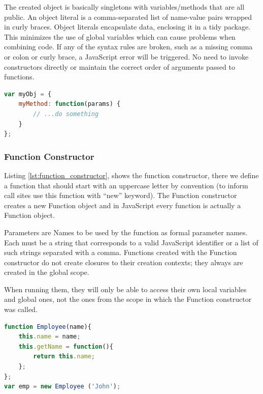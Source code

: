 The created object is basically singletons with variables/methods that are all public. An object literal is a comma-separated list of name-value pairs wrapped in curly braces. Object literals encapsulate data, enclosing it in a tidy package. This minimizes the use of global variables which can cause problems when combining code. If any of the syntax rules are broken, such as a missing comma or colon or curly brace, a JavaScript error will be triggered. No need to invoke constructors directly or maintain the correct order of arguments passed to functions.
\begin{lstlisting}[caption={Object literal expression},label={lst:object_literal_expression},language=JavaScript] 
var myObj = {
	myMethod: function(params) {
		// ...do something
	}
};
\end{lstlisting}

\noindent\subsubsection{Function Constructor}

Listing \ref{lst:function_constructor}, shows the function constructor, there we define a function that should start with an uppercase letter by convention (to inform call sites use this function with “new” keyword). The Function constructor creates a new Function object and in JavaScript every function is actually a Function object.

Parameters are Names to be used by the function as formal parameter names. Each must be a string that corresponds to a valid JavaScript identifier or a list of such strings separated with a comma. Functions created with the Function constructor do not create closures to their creation contexts; they always are created in the global scope.

When running them, they will only be able to access their own local variables and global ones, not the ones from the scope in which the Function constructor was called.

\begin{lstlisting}[caption={Function constructor},label={lst:function_constructor},language=JavaScript] 
function Employee(name){
	this.name = name;
	this.getName = function(){
		return this.name;
	};	
};
var emp = new Employee ('John');
\end{lstlisting}